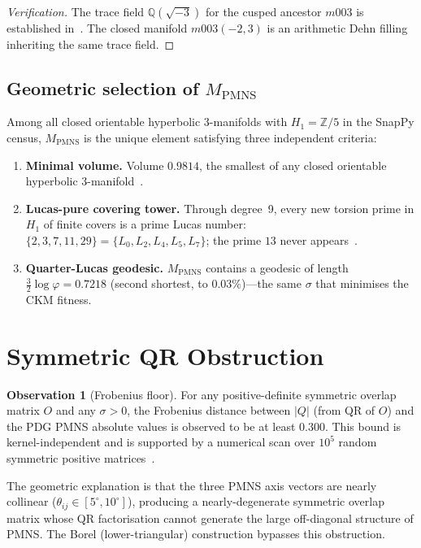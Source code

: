 \documentclass[11pt,a4paper]{article}
\theoremstyle{definition}
\newtheorem{observation}[theorem]{Observation}
\newcommand{\MPMNS}{M_{\mathrm{PMNS}}}
\newcommand{\Zfive}{\mathbb{Z}/5}
\begin{document}
\begin{proof}[Verification]
The trace field $\mathbb{Q}(\sqrt{-3})$ for the cusped ancestor
$m003$ is established in~\cite{Chinburg98}.
The closed manifold $m003(-2,3)$ is an arithmetic Dehn filling
inheriting the same trace field.
\end{proof}

\subsection{Geometric selection of $\MPMNS$}

Among all closed orientable hyperbolic 3-manifolds with $H_1=\Zfive$
in the SnapPy census, $\MPMNS$ is the unique element satisfying three
independent criteria:
\begin{enumerate}[(1)]
\item \textbf{Minimal volume.} Volume $0.9814$, the smallest of any
  closed orientable hyperbolic 3-manifold~\cite{GMM}.
\item \textbf{Lucas-pure covering tower.} Through degree~9, every new
  torsion prime in $H_1$ of finite covers is a prime Lucas number:
  $\{2,3,7,11,29\}=\{L_0,L_2,L_4,L_5,L_7\}$;
  the prime $13$ never appears~\cite{Gentry:Lucas,Gentry:Covering}.
\item \textbf{Quarter-Lucas geodesic.} $\MPMNS$ contains a geodesic
  of length $\frac{3}{2}\log\varphi=0.7218$ (second shortest, to
  $0.03\%$)---the same $\sigma$ that minimises the CKM fitness.
\end{enumerate}

\section{Symmetric QR Obstruction}
\label{sec:obstruction}

\begin{observation}[Frobenius floor]
\label{obs:floor}
For any positive-definite symmetric overlap matrix $O$ and any
$\sigma>0$, the Frobenius distance between $|Q|$ (from QR of $O$)
and the PDG PMNS absolute values is observed to be at least $0.300$.
This bound is kernel-independent and is supported by a numerical
scan over $10^5$ random symmetric positive matrices~\cite{Gentry:PMNS_arxiv}.
\end{observation}

The geometric explanation is that the three PMNS axis vectors are
nearly collinear ($\theta_{ij}\in[5^\circ,10^\circ]$), producing
a nearly-degenerate symmetric overlap matrix whose QR factorisation
cannot generate the large off-diagonal structure of PMNS.
The Borel (lower-triangular) construction bypasses this obstruction.
\end{document}
